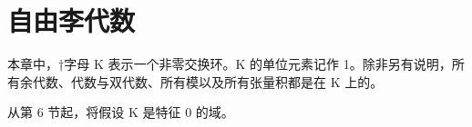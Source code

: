\chapter{自由李代数}

本章中，†字母 K 表示一个非零交换环。K 的单位元素记作 1。除非另有说明，所有余代数、代数与双代数、所有模以及所有张量积都是在 K 上的。

从第 6 节起，将假设 K 是特征 0 的域。

